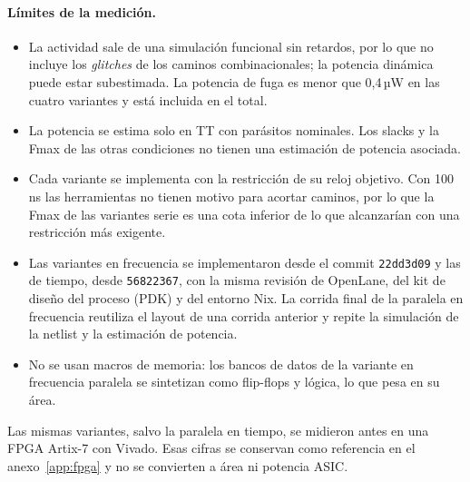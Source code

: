 \paragraph{Límites de la medición.}
\begin{itemize}
  \item La actividad sale de una simulación funcional sin retardos, por lo que no incluye los \emph{glitches} de los caminos combinacionales; la potencia dinámica puede estar subestimada. La potencia de fuga es menor que 0,4\,µW en las cuatro variantes y está incluida en el total.
  \item La potencia se estima solo en TT con parásitos nominales. Los slacks y la Fmax de las otras condiciones no tienen una estimación de potencia asociada.
  \item Cada variante se implementa con la restricción de su reloj objetivo. Con 100\,ns las herramientas no tienen motivo para acortar caminos, por lo que la Fmax de las variantes serie es una cota inferior de lo que alcanzarían con una restricción más exigente.
  \item Las variantes en frecuencia se implementaron desde el commit \texttt{22dd3d09} y las de tiempo, desde \texttt{56822367}, con la misma revisión de OpenLane, del kit de diseño del proceso (PDK) y del entorno Nix. La corrida final de la paralela en frecuencia reutiliza el layout de una corrida anterior y repite la simulación de la netlist y la estimación de potencia.
  \item No se usan macros de memoria: los bancos de datos de la variante en frecuencia paralela se sintetizan como flip-flops y lógica, lo que pesa en su área.
\end{itemize}

Las mismas variantes, salvo la paralela en tiempo, se midieron antes en una FPGA Artix-7 con Vivado. Esas cifras se conservan como referencia en el anexo~\ref{app:fpga} y no se convierten a área ni potencia ASIC.
